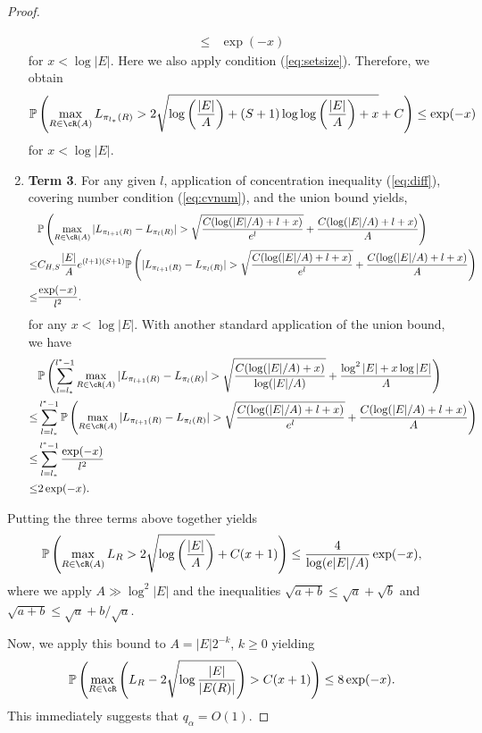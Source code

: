 \begin{proof}
\begin{enumerate}
\begin{align*}
\le & \exp(-x) 
\end{align*}
for $x<\log |E|$. Here we also apply condition (\ref{eq:setsize}). Therefore, we obtain
$$
\PP\left(\max_{R\in\cR(A)}L_{\pi_{l_\ast}(R)}>2\sqrt{\log\left(|E|\over A\right)+(S+1)\log\log\left(|E|\over A\right)+x}+C\right)\le \exp(-x) 
$$
for $x<\log |E|$.
\item[] \textbf{Term 3}. For any given $l$, application of concentration inequality (\ref{eq:diff}), covering number condition (\ref{eq:cvnum}), and the union bound yields,
\begin{align*}
&\PP\left(\max_{R\in\cR(A)}|L_{\pi_{l+1}(R)}-L_{\pi_{l}(R)}|>\sqrt{C(\log(|E|/A)+l+x)\over e^l}+{C(\log(|E|/A)+l+x) \over A }\right) \\
\le & C_{H,S}{|E|\over A}e^{(l+1)(S+1)}\PP\left(|L_{\pi_{l+1}(R)}-L_{\pi_{l}(R)}|>\sqrt{C(\log(|E|/A)+l+x)\over e^l}+{C(\log(|E|/A)+l+x) \over A }\right)\\
 \le & {\exp(-x)\over l^2}.
\end{align*}
for any $x<\log |E|$. 
With another standard application of the union bound, we have
\begin{align*}
&\PP\left(\sum_{l=l_\ast}^{l^\ast-1}\max_{R\in\cR(A)}|L_{\pi_{l+1}(R)}-L_{\pi_{l}(R)}|>\sqrt{C(\log(|E|/A)+x) \over \log(|E|/A)}+{\log^2|E|+x\log|E|\over A}\right)  \\ 
\le & \sum_{l=l_\ast}^{l^\ast-1} \PP\left(\max_{R\in\cR(A)}|L_{\pi_{l+1}(R)}-L_{\pi_{l}(R)}|>\sqrt{C(\log(|E|/A)+l+x)\over e^l}+{C(\log(|E|/A)+l+x) \over A }\right)\\
\le & \sum_{l=l_\ast}^{l^\ast-1} {\exp(-x)\over l^2}\\
\le & 2\exp(-x).
\end{align*}
\end{enumerate}
Putting the three terms above together yields
$$
\PP\left(\max_{R\in\cR(A)}L_R>2\sqrt{\log\left(|E|\over A\right)}+C(x+1)\right)\le {4\over \log(e|E|/A)}\exp(-x),
$$
where we apply $A\gg \log^2|E|$ and the inequalities $\sqrt{a+b}\le \sqrt{a}+\sqrt{b}$ and $\sqrt{a+b}\le \sqrt{a}+b/\sqrt{a}$.

Now, we apply this bound to $A=|E|2^{-k}$, $k\ge 0$ yielding 
$$
\PP\left(\max_{R\in\cR}\left(L_R-2\sqrt{\log{|E|\over |E(R)|}}\right)>C(x+1)\right)\le 8\exp(-x).
$$
This immediately suggests that $q_\alpha=O(1)$.


\end{proof}
